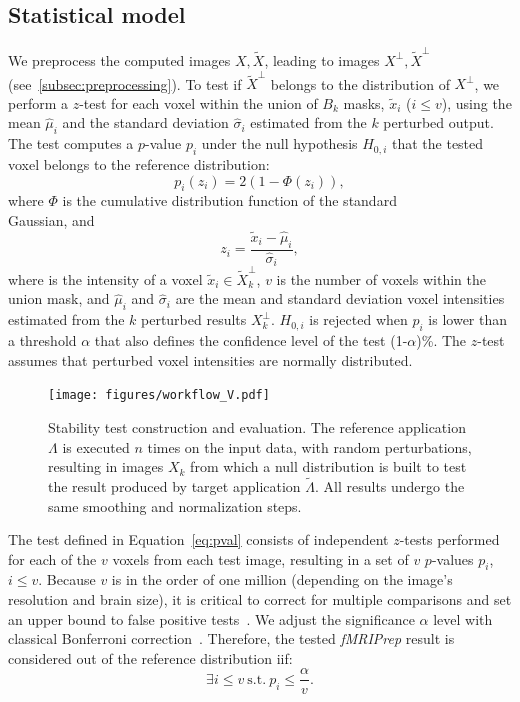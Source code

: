 \documentclass[lettersize,journal]{IEEEtran}
\newcommand{\fmriprep}{\emph{fMRIPrep}\xspace}
\newcommand{\add}[1]{\textcolor{green!60!black}{#1\\}} %
\begin{document}
\subsection{Statistical model}
\label{subsec:statistical_model}

We preprocess the computed images $X,\tilde X$, leading to images $X^\perp,
  \tilde X^\perp$ (see~\ref{subsec:preprocessing}). To test if $\tilde X^\perp$
belongs to the distribution of $X^\perp$, we perform a $z$-test for each voxel
within the union of $B_k$ masks, $\tilde x_i$ ($i\leq v$), using the mean $\hat
  \mu_i$ and the standard deviation $\hat \sigma_i$ estimated from the $k$
perturbed output. The test computes a $p$-value $p_i$ under the null hypothesis
$H_{0,i}$ that the tested voxel belongs to the reference distribution:
\begin{equation} \label{eq:pval}
  p_i(z_i) = 2 \left(1-\Phi(z_i)\right),
\end{equation}
where $\Phi$ is the cumulative distribution function of the \add{standard} Gaussian, and
\begin{equation*}
  z_i = \frac{\tilde x_i-\hat \mu_i}{\hat \sigma_i},
\end{equation*}
where is the intensity of a voxel $\tilde x_i \in \tilde X_k^\perp$, $v$ is the number of voxels within the union mask,
and $\hat \mu_i$ and $\hat \sigma_i$ are the mean and standard deviation voxel intensities estimated
from the $k$ perturbed results $X_k^\perp$.
$H_{0,i}$ is rejected when $p_i$ is lower than a threshold $\alpha$ that also defines the confidence level of the test (1-$\alpha$)\%.
The $z$-test assumes that perturbed voxel intensities are normally distributed.

\begin{figure}
  \centering
  \texttt{[image: figures/workflow\_V.pdf]}
  \caption{Stability test construction and evaluation. The reference application $\Lambda$ is executed $n$ times on the input data, with random perturbations, resulting in images $X_k$ from which a null distribution is built to test the result produced by target application $\tilde \Lambda$. All results undergo the same smoothing and normalization steps.}
  \label{fig:test_workflow}
\end{figure}

The test defined in Equation~\ref{eq:pval} consists of independent $z$-tests
performed for each of the $v$ voxels from each test image, resulting in a set
of $v$ $p$-values $p_i$, $i \leq v$. Because $v$ is in the order of one million
(depending on the image's resolution and brain size), it is critical to correct
for multiple comparisons and set an upper bound to false positive
tests~\cite{NICHOLS2007246}. We adjust the significance $\alpha$ level with
classical Bonferroni correction~\cite{farcomeni2008review}. Therefore, the
tested \fmriprep result is considered out of the reference distribution iif:
\begin{equation}
  \label{eq:bonferroni}
  \exists i \leq v \ \text{s.t.} \ p_i \leq \frac{\alpha}{v}.
\end{equation}
\end{document}
